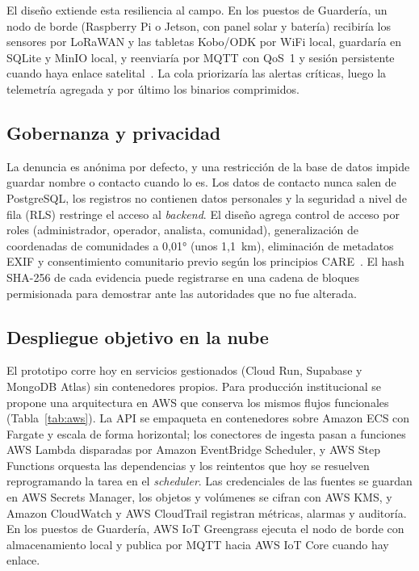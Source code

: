 \documentclass[conference]{IEEEtran}
\begin{document}
El diseño extiende esta resiliencia al campo. En los puestos de Guardería, un nodo de borde (Raspberry Pi o Jetson, con panel solar y batería) recibiría los sensores por LoRaWAN y las tabletas Kobo/ODK por WiFi local, guardaría en SQLite y MinIO local, y reenviaría por MQTT con QoS~1 y sesión persistente cuando haya enlace satelital~\cite{rosli2020}. La cola priorizaría las alertas críticas, luego la telemetría agregada y por último los binarios comprimidos.

\subsection{Gobernanza y privacidad}
La denuncia es anónima por defecto, y una restricción de la base de datos impide guardar nombre o contacto cuando lo es. Los datos de contacto nunca salen de PostgreSQL, los registros no contienen datos personales y la seguridad a nivel de fila (RLS) restringe el acceso al \emph{backend}. El diseño agrega control de acceso por roles (administrador, operador, analista, comunidad), generalización de coordenadas de comunidades a 0,01° (unos 1,1~km), eliminación de metadatos EXIF y consentimiento comunitario previo según los principios CARE~\cite{carroll2020}. El hash SHA-256 de cada evidencia puede registrarse en una cadena de bloques permisionada para demostrar ante las autoridades que no fue alterada.

\subsection{Despliegue objetivo en la nube}
El prototipo corre hoy en servicios gestionados (Cloud Run, Supabase y MongoDB Atlas) sin contenedores propios. Para producción institucional se propone una arquitectura en AWS que conserva los mismos flujos funcionales (Tabla~\ref{tab:aws}). La API se empaqueta en contenedores sobre Amazon ECS con Fargate y escala de forma horizontal; los conectores de ingesta pasan a funciones AWS Lambda disparadas por Amazon EventBridge Scheduler, y AWS Step Functions orquesta las dependencias y los reintentos que hoy se resuelven reprogramando la tarea en el \emph{scheduler}. Las credenciales de las fuentes se guardan en AWS Secrets Manager, los objetos y volúmenes se cifran con AWS KMS, y Amazon CloudWatch y AWS CloudTrail registran métricas, alarmas y auditoría. En los puestos de Guardería, AWS IoT Greengrass ejecuta el nodo de borde con almacenamiento local y publica por MQTT hacia AWS IoT Core cuando hay enlace.
\end{document}
